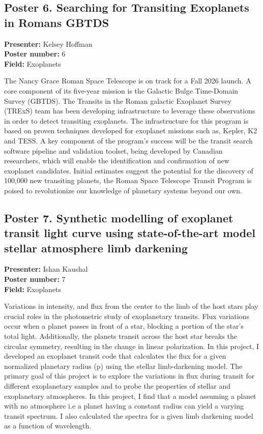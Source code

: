 \hypertarget{poster-abstract-talk-186}{}\label{poster-abstract-page-talk-186}
\subsection*{Poster 6. Searching for Transiting Exoplanets in Romans GBTDS}
\textbf{Presenter:} Kelsey Hoffman\\
\textbf{Poster number:} 6\\
\textbf{Field:} Exoplanets

The Nancy Grace Roman Space Telescope is on track for a Fall 2026 launch. A core component of its five-year mission is the Galactic Bulge Time-Domain Survey (GBTDS). The Transits in the Roman galactic Exoplanet Survey (TRExS) team has been developing infrastructure to leverage these observations in order to detect transiting exoplanets. The infrastructure for this program is based on proven techniques developed for exoplanet missions such as, Kepler, K2 and TESS. A key component of the program's success will be the transit search software pipeline and validation toolset, being developed by Canadian researchers, which will enable the identification and confirmation of new exoplanet candidates. Initial estimates suggest the potential for the discovery of 100,000 new transiting planets, the Roman Space Telescope Transit Program is poised to revolutionize our knowledge of planetary systems beyond our own.

\hypertarget{poster-abstract-talk-276}{}\label{poster-abstract-page-talk-276}
\subsection*{Poster 7. Synthetic modelling of exoplanet transit light curve using state-of-the-art model stellar atmosphere limb darkening}
\textbf{Presenter:} Ishan Kaushal\\
\textbf{Poster number:} 7\\
\textbf{Field:} Exoplanets

Variations in intensity, and flux from the center to the limb of the host stars play crucial roles in the photometric study of exoplanetary transits. Flux variations occur when a planet passes in front of a star, blocking a portion of the star's total light. Additionally, the planets transit across the host star breaks the circular symmetry, resulting in the change in linear polarization. In this project, I developed an exoplanet transit code that calculates the flux for a given normalized planetary radius (p) using the stellar limb-darkening model. The primary goal of this project is to explore the variations in flux during transit for different exoplanetary samples and to probe the properties of stellar and exoplanetary atmospheres. In this project, I find that a model assuming a planet with no atmosphere i.e a planet having a constant radius can yield a varying transit spectrum. I also calculated the spectra for a given limb darkening model as a function of wavelength.

